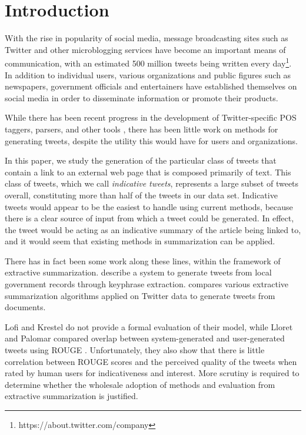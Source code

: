 \section{Introduction}
\label{sec:intro}
With the rise in popularity of social media, message broadcasting sites such as Twitter and other microblogging services have become an important means of communication, with an estimated 500 million tweets being written every day\footnote{https://about.twitter.com/company}. In addition to individual users, various organizations and public figures such as newspapers, government officials and entertainers have established themselves on social media in order to disseminate information or promote their products. 

While there has been recent progress in the development of Twitter-specific POS taggers, parsers, and other tools \cite{owoputi-etal-2013,kong-etal-2014}, there has been little work on methods for generating tweets, despite the utility this would have for users and organizations. 

In this paper, we study the generation of the particular class of tweets that contain a link to an external web page that is composed primarily of text. This class of tweets, which we call \emph{indicative tweets}, represents a large subset of tweets overall, constituting more than half of the tweets in our data set.  Indicative tweets would appear to be the easiest to handle using current methods, because there is a clear source of input from which a tweet could be generated. In effect, the tweet would be acting as an indicative summary of the article being linked to, and it would seem that existing methods in summarization can be applied. 

There has in fact been some work along these lines, within the framework of extractive summarization.  describe a system to generate tweets from local government records through keyphrase extraction.  compares various extractive summarization algorithms applied on Twitter data to generate tweets from documents. 

Lofi and Krestel do not provide a formal evaluation of their model, while Lloret and Palomar compared overlap between system-generated and user-generated tweets using ROUGE 
\cite{lin2004rouge}. Unfortunately, they also show that there is little correlation between ROUGE scores and the perceived quality of the tweets when rated by human users for indicativeness and interest. More scrutiny is required to determine whether the wholesale adoption of methods and evaluation from extractive summarization is justified.


